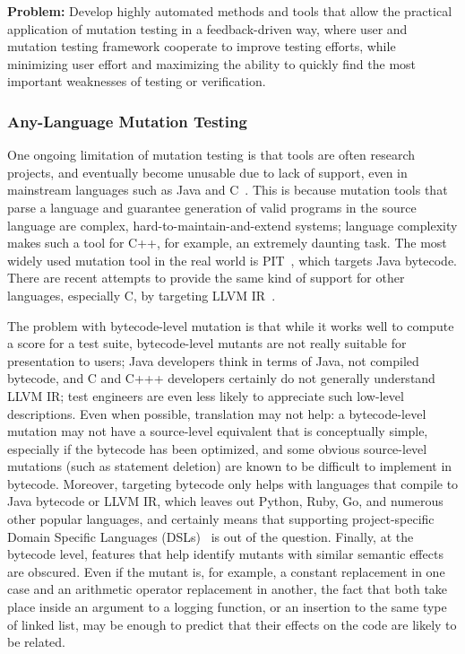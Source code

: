 \begin{framed}
{\bf Problem:}  Develop highly automated methods and tools that allow the practical application of mutation testing in a feedback-driven way, where user and mutation testing framework cooperate to improve testing efforts, while minimizing user effort and maximizing the ability to quickly find the most important weaknesses of testing or verification.
\end{framed}

\subsubsection{Any-Language Mutation Testing}

One ongoing limitation of mutation testing is that tools are often research projects, and eventually become unusable due to lack of support, even in mainstream languages such as Java and C~\cite{MutChoice}.  This is because mutation tools that parse a language and guarantee generation of valid programs in the source language are complex, hard-to-maintain-and-extend systems; language complexity makes such a tool for C++, for example, an extremely daunting task.  The most widely used mutation tool in the real world is PIT~\cite{pittest}, which targets Java bytecode.  There are recent attempts to provide the same kind of support for other languages, especially C, by targeting LLVM IR~\cite{HaririLLVM}.

The problem with bytecode-level mutation is that while it works well to compute a score for a test suite, bytecode-level mutants are not really suitable for presentation to users; Java developers think in terms of Java, not compiled bytecode, and C and C+++ developers certainly do not generally understand LLVM IR; test engineers are even less likely to appreciate such low-level descriptions.  Even when possible, translation may not help: a bytecode-level mutation may not have a source-level equivalent that is conceptually simple, especially if the bytecode has been optimized, and some obvious source-level mutations (such as statement deletion) are known to be difficult to implement in bytecode.  Moreover, targeting bytecode only helps with languages that compile to Java bytecode or LLVM IR, which leaves out Python, Ruby, Go, and numerous other popular languages, and certainly means that supporting project-specific Domain Specific Languages (DSLs)~\cite{Fow10} is out of the question.  Finally, at the bytecode level, features that help identify mutants with similar semantic effects are obscured.  Even if the mutant is, for example, a constant replacement in one case and an arithmetic operator replacement in another, the fact that both take place inside an argument to a logging function, or an insertion to the same type of linked list, may be enough to predict that their effects on the code are likely to be related.

